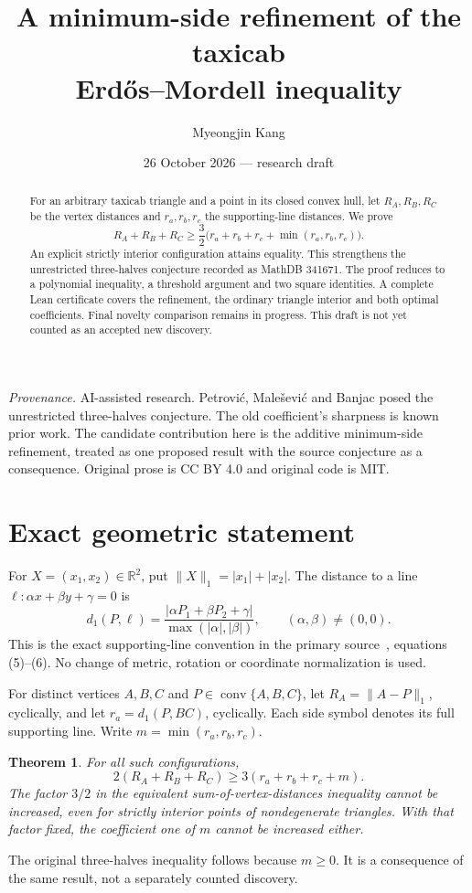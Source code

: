 \documentclass[11pt]{article}
\title{A minimum-side refinement of the taxicab\\Erd\H{o}s--Mordell inequality}
\author{Myeongjin Kang}
\date{26 October 2026 --- research draft}
\newtheorem{theorem}{Theorem}
\newcommand{\R}{\mathbb R}
\newcommand{\abs}[1]{\lvert#1\rvert}
\newcommand{\norm}[1]{\lVert#1\rVert_1}
\begin{document}
\maketitle
\begin{abstract}
For an arbitrary taxicab triangle and a point in its closed convex hull, let $R_A,R_B,R_C$ be the vertex distances and $r_a,r_b,r_c$ the supporting-line distances. We prove
\[
 R_A+R_B+R_C\ge\frac32\bigl(r_a+r_b+r_c+\min(r_a,r_b,r_c)\bigr).
\]
An explicit strictly interior configuration attains equality. This strengthens the unrestricted three-halves conjecture recorded as MathDB 341671. The proof reduces to a polynomial inequality, a threshold argument and two square identities. A complete Lean certificate covers the refinement, the ordinary triangle interior and both optimal coefficients. Final novelty comparison remains in progress. This draft is not yet counted as an accepted new discovery.
\end{abstract}
\noindent\textit{Provenance.} AI-assisted research. Petrovi\'c, Male\v{s}evi\'c and Banjac posed the unrestricted three-halves conjecture. The old coefficient's sharpness is known prior work. The candidate contribution here is the additive minimum-side refinement, treated as one proposed result with the source conjecture as a consequence. Original prose is CC BY 4.0 and original code is MIT.

\section{Exact geometric statement}
For $X=(x_1,x_2)\in\R^2$, put $\norm X=\abs{x_1}+\abs{x_2}$. The distance to a line $\ell:\alpha x+\beta y+\gamma=0$ is
\begin{equation}\label{eq:distance}
 d_1(P,\ell)=\frac{\abs{\alpha P_1+\beta P_2+\gamma}}{\max(\abs\alpha,\abs\beta)},\qquad(\alpha,\beta)\ne(0,0).
\end{equation}
This is the exact supporting-line convention in the primary source~\cite{pmb}, equations (5)--(6). No change of metric, rotation or coordinate normalization is used.

For distinct vertices $A,B,C$ and $P\in\operatorname{conv}\{A,B,C\}$, let $R_A=\norm{A-P}$, cyclically, and let $r_a=d_1(P,BC)$, cyclically. Each side symbol denotes its full supporting line. Write $m=\min(r_a,r_b,r_c)$.
\begin{theorem}\label{thm:main}
For all such configurations,
\begin{equation}\label{eq:main}
 2(R_A+R_B+R_C)\ge3(r_a+r_b+r_c+m).
\end{equation}
The factor $3/2$ in the equivalent sum-of-vertex-distances inequality cannot be increased, even for strictly interior points of nondegenerate triangles. With that factor fixed, the coefficient one of $m$ cannot be increased either.
\end{theorem}
The original three-halves inequality follows because $m\ge0$. It is a consequence of the same result, not a separately counted discovery.
\end{document}
